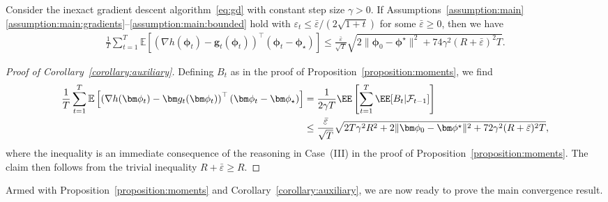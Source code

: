 \documentclass[11pt, a4paper, oneside, reqno]{article}
\begin{document}
	\begin{corollary}
	\label{corollary:auxiliary}
	Consider the inexact gradient descent algorithm~\eqref{eq:gd} with constant step size $\gamma > 0$. If Assumptions~\ref{assumption:main}\,\ref{assumption:main:gradients}--\ref{assumption:main:bounded} hold with $\varepsilon_t \leq {\bar \varepsilon}/{(2\sqrt{1+t})}$ for some $\bar \varepsilon \geq 0$, then we have
	\begin{align*}
		\frac{1}{T} \sum_{t=1}^T \mathbb E \left[ \left( \nabla h(\bm \phi_{t}) - \bm g_t(\bm \phi_{t}) \right)^\top (\bm \phi_{t} - \bm \phi_{\star}) \right]
		\leq \frac{\bar \varepsilon}{\sqrt{T}} \sqrt{2 \| \bm \phi_0 - \bm \phi^\star \|^2 + 74 \gamma^2 (R + \bar \varepsilon)^2 T}.
	\end{align*}
	\end{corollary}
	\begin{proof}[Proof of Corollary~\ref{corollary:auxiliary}]
	Defining $B_t$ as in the proof of Proposition~\ref{proposition:moments}, we find
	\begin{align*}
	    \frac{1}{T} \sum_{t=1}^T \mathbb E \left[ \left( \nabla h(\bm \phi_{t}) - \bm g_t(\bm \phi_{t}) \right)^\top (\bm \phi_{t} - \bm \phi_{\star}) \right]
	    &=
	    \frac{1}{2 \gamma T} \EE \left[  \sum_{t=1}^T \EE [B_t | \mathcal F_{t-1}] \right] \\
		&\leq \frac{\bar \varepsilon}{\sqrt{T}} \sqrt{2 T \gamma^2 R^2 + 2 \| \bm \phi_0 - \bm \phi^\star \|^2 + 72 \gamma^2 (R + \bar \varepsilon)^2 T},
	\end{align*}
	where the inequality is an immediate consequence of the reasoning in Case~(III) in the proof of Proposition~\ref{proposition:moments}. The claim then follows from the trivial inequality $R+ \bar \varepsilon \geq R$.
	\end{proof}
	
	
	Armed with Proposition~\ref{proposition:moments} and Corollary~\ref{corollary:auxiliary}, we are now ready to prove the main convergence result.
	
\end{document}
